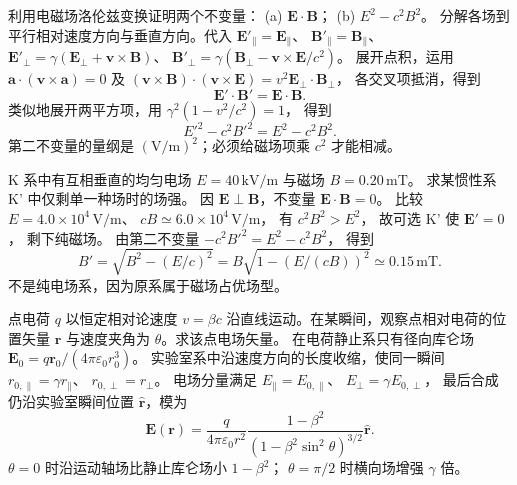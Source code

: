 利用电磁场洛伦兹变换证明两个不变量：
(a) $\bm E\cdot\bm B$；
(b) $E^2-c^2B^2$。
\exsolution
分解各场到平行相对速度方向与垂直方向。代入
$\bm E'_\parallel=\bm E_\parallel$、
$\bm B'_\parallel=\bm B_\parallel$、
$\bm E'_\perp=\gamma(\bm E_\perp+\bm v\times\bm B)$、
$\bm B'_\perp=\gamma(\bm B_\perp-\bm v\times\bm E/c^2)$。
展开点积，运用
$\bm a\cdot(\bm v\times\bm a)=0$
及
$(\bm v\times\bm B)\cdot(\bm v\times\bm E)
=v^2\bm E_\perp\cdot\bm B_\perp$，
各交叉项抵消，得到
\[
\boxed{\bm E'\cdot\bm B'=\bm E\cdot\bm B}.
\]
类似地展开两平方项，用
$\gamma^2(1-v^2/c^2)=1$，
得到
\[
\boxed{E'^2-c^2B'^2=E^2-c^2B^2}.
\]
\excheck 第二不变量的量纲是 $(\mathrm{V/m})^2$；必须给磁场项乘 $c^2$ 才能相减。

K 系中有互相垂直的均匀电场
$E=40\,\mathrm{kV/m}$ 与磁场
$B=0.20\,\mathrm{mT}$。
求某惯性系 K' 中仅剩单一种场时的场强。
\exsolution
因 $\bm E\perp\bm B$，不变量
$\bm E\cdot\bm B=0$。
比较
$E=4.0\times10^4\,\mathrm{V/m}$、
$cB\simeq6.0\times10^4\,\mathrm{V/m}$，
有 $c^2B^2>E^2$，
故可选 K' 使 $\bm E'=0$，
剩下纯磁场。
由第二不变量
$-c^2B'^2=E^2-c^2B^2$，
得到
\[
\boxed{B'=\sqrt{B^2-(E/c)^2}
=B\sqrt{1-(E/(cB))^2}
\simeq0.15\,\mathrm{mT}}.
\]
\excheck 不是纯电场系，因为原系属于磁场占优场型。

点电荷 $q$ 以恒定相对论速度 $v=\beta c$ 沿直线运动。在某瞬间，观察点相对电荷的位置矢量 $\bm r$ 与速度夹角为 $\theta$。求该点电场矢量。
\exsolution
在电荷静止系只有径向库仑场
$\bm E_0=q\bm r_0/(4\pi\varepsilon_0r_0^3)$。
实验室系中沿速度方向的长度收缩，使同一瞬间
$r_{0,\parallel}=\gamma r_\parallel$、
$r_{0,\perp}=r_\perp$。
电场分量满足
$E_\parallel=E_{0,\parallel}$、
$E_\perp=\gamma E_{0,\perp}$，
最后合成仍沿实验室瞬间位置 $\hat{\bm r}$，模为
\[
\boxed{\bm E(\bm r)=
\frac{q}{4\pi\varepsilon_0r^2}
\frac{1-\beta^2}{(1-\beta^2\sin^2\theta)^{3/2}}
\hat{\bm r}}.
\]
\excheck $\theta=0$ 时沿运动轴场比静止库仑场小 $1-\beta^2$；
$\theta=\pi/2$ 时横向场增强 $\gamma$ 倍。
